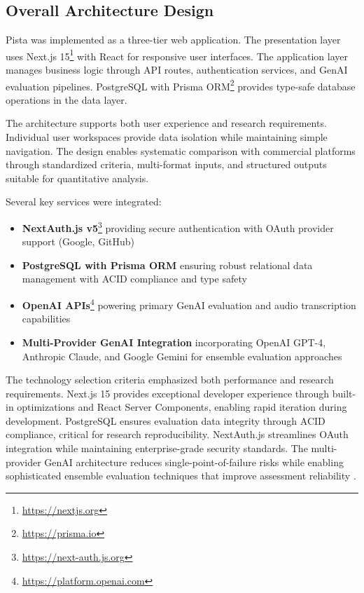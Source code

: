 \subsection{Overall Architecture Design}\label{subsec:architecture-overview}
Pista was implemented as a three-tier web application. The presentation layer uses Next.js 15\footnote{\url{https://nextjs.org}} with React for responsive user interfaces. The application layer manages business logic through API routes, authentication services, and GenAI evaluation pipelines. PostgreSQL with Prisma ORM\footnote{\url{https://prisma.io}} provides type-safe database operations in the data layer.

The architecture supports both user experience and research requirements. Individual user workspaces provide data isolation while maintaining simple navigation. The design enables systematic comparison with commercial platforms through standardized criteria, multi-format inputs, and structured outputs suitable for quantitative analysis.

Several key services were integrated:
\begin{itemize}
  \item \textbf{NextAuth.js v5}\footnote{\url{https://next-auth.js.org}} providing secure authentication with OAuth provider support (Google, GitHub)
  \item \textbf{PostgreSQL with Prisma ORM} ensuring robust relational data management with ACID compliance and type safety
  \item \textbf{OpenAI APIs}\footnote{\url{https://platform.openai.com}} powering primary GenAI evaluation and audio transcription capabilities
  \item \textbf{Multi-Provider GenAI Integration} incorporating OpenAI GPT-4, Anthropic Claude, and Google Gemini for ensemble evaluation approaches
\end{itemize}

The technology selection criteria emphasized both performance and research requirements. Next.js 15 provides exceptional developer experience through built-in optimizations and React Server Components, enabling rapid iteration during development. PostgreSQL ensures evaluation data integrity through ACID compliance, critical for research reproducibility. NextAuth.js streamlines OAuth integration while maintaining enterprise-grade security standards. The multi-provider GenAI architecture reduces single-point-of-failure risks while enabling sophisticated ensemble evaluation techniques that improve assessment reliability \cite{Steyvers2024}.


